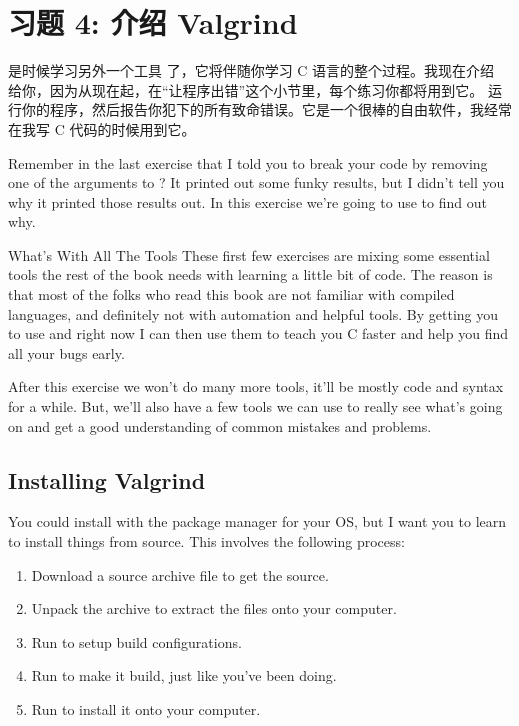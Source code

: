 \chapter{习题 4: 介绍 Valgrind}

是时候学习另外一个工具  了，它将伴随你学习 C 语言的整个过程。我现在介绍  给你，因为从现在起，在“让程序出错”这个小节里，每个练习你都将用到它。 运行你的程序，然后报告你犯下的所有致命错误。它是一个很棒的自由软件，我经常在我写 C 代码的时候用到它。

Remember in the last exercise that I told you to break your code by
removing one of the arguments to ?  It printed out some
funky results, but I didn't tell you why it printed those results out.
In this exercise we're going to use  to find out 
why.

\begin{aside}{What's With All The Tools}
These first few exercises are mixing some essential tools the rest
of the book needs with learning a little bit of code.  The reason is
that most of the folks who read this book are not familiar with compiled
languages, and definitely not with automation and helpful tools.  By 
getting you to use  and  right now I can
then use them to teach you C faster and help you find all your bugs
early.

After this exercise we won't do many more tools, it'll be mostly
code and syntax for a while.  But, we'll also have a few tools we
can use to really see what's going on and get a good understanding
of common mistakes and problems.
\end{aside}

\section{Installing Valgrind}

You could install  with the package manager for your
OS, but I want you to learn to install things from source.  This involves
the following process:

\begin{enumerate}
\item Download a source archive file to get the source.
\item Unpack the archive to extract the files onto your computer.
\item Run  to setup build configurations.
\item Run  to make it build, just like you've been doing.
\item Run  to install it onto your computer.
\end{enumerate}

